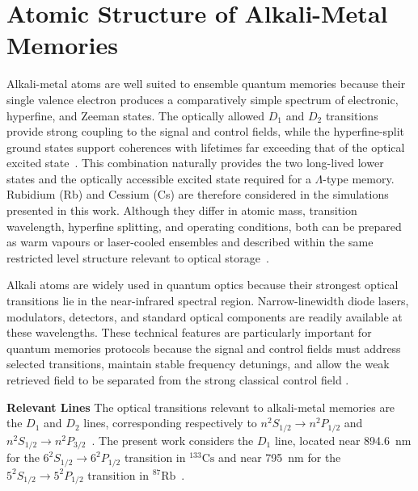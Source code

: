 \section{Atomic Structure of Alkali-Metal Memories}
\label{sec}

Alkali-metal atoms are well suited to ensemble quantum memories because their single valence electron produces a comparatively simple spectrum of electronic, hyperfine, and Zeeman states. The optically allowed $D_1$ and $D_2$ transitions provide strong coupling to the signal and control fields, while the hyperfine-split ground states support coherences with lifetimes far exceeding that of the optical excited state~\cite{Qmeaara_HeshamiEtAl_2016,JiangEtAl_2016,Apgteitiav_FinkelsteinEtAl_2023}. This combination naturally provides the two long-lived lower states and the optically accessible excited state required for a $\Lambda$-type memory. Rubidium (Rb) and Cessium (Cs) are therefore considered in the simulations presented in this work. Although they differ in atomic mass, transition wavelength, hyperfine splitting, and operating conditions, both can be prepared as warm vapours or laser-cooled ensembles and described within the same restricted level structure relevant to optical storage~\cite{Oqmboeit_MaEtAl_2017}.

Alkali atoms are widely used in quantum optics because their strongest optical transitions lie in the near-infrared spectral region. Narrow-linewidth diode lasers, modulators, detectors, and standard optical components are readily available at these wavelengths. These technical features are particularly important for quantum memories protocols because the signal and control fields must address selected transitions, maintain stable frequency detunings, and allow the weak retrieved field to be separated from the strong classical control field \cite{Oqmboeit_MaEtAl_2017}.

\textbf{Relevant Lines} 
The optical transitions relevant to alkali-metal memories are the $D_1$ and $D_2$ lines, corresponding respectively to $n^2S_{1/2}\rightarrow n^2P_{1/2}$ and $n^2S_{1/2}\rightarrow n^2P_{3/2}$~\cite{CsDataLineSteck,RbDataLineSteck}. The present work considers the $D_1$ line, located near \SI{894.6}{\nano\metre} for the $6^2S_{1/2}\rightarrow6^2P_{1/2}$ transition in ${}^{133}\mathrm{Cs}$ and near \SI{795}{\nano\metre} for the $5^2S_{1/2}\rightarrow5^2P_{1/2}$ transition in ${}^{87}\mathrm{Rb}$~\cite{CsDataLineSteck,RbDataLineSteck,Oqmboeit_MaEtAl_2017}.

